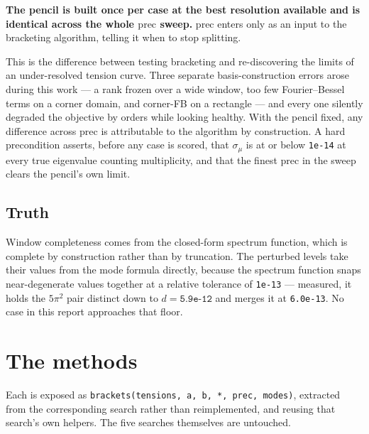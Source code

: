\documentclass[11pt,a4paper]{article}
\newcommand{\pr}{\ensuremath{\mathrm{prec}}}
\newcommand{\sig}{\ensuremath{\sigma}}
\begin{document}
\textbf{The pencil is built once per case at the best resolution available and is identical
across the whole $\pr$ sweep.} $\pr$ enters only as an input to the bracketing algorithm,
telling it when to stop splitting.

This is the difference between testing bracketing and re-discovering the limits of an
under-resolved tension curve. Three separate basis-construction errors arose during this work
--- a rank frozen over a wide window, too few Fourier--Bessel terms on a corner domain, and
corner-FB on a rectangle --- and every one silently degraded the objective by orders while
looking healthy. With the pencil fixed, any difference across $\pr$ is attributable to the
algorithm by construction. A hard precondition asserts, before any case is scored, that
$\sig_\mu$ is at or below \texttt{1e-14} at every true eigenvalue counting multiplicity, and
that the finest $\pr$ in the sweep clears the pencil's own limit.

\subsection{Truth}

Window completeness comes from the closed-form spectrum function, which is complete by
construction rather than by truncation. The perturbed levels take their values from the mode
formula directly, because the spectrum function snaps near-degenerate values together at a
relative tolerance of \texttt{1e-13} --- measured, it holds the $5\pi^2$ pair distinct down to
$d = \texttt{5.9e-12}$ and merges it at \texttt{6.0e-13}. No case in this report approaches that
floor.

\section{The methods}

Each is exposed as \texttt{brackets(tensions, a, b, *, prec, modes)}, extracted from the
corresponding search rather than reimplemented, and reusing that search's own helpers. The five
searches themselves are untouched.
\end{document}

